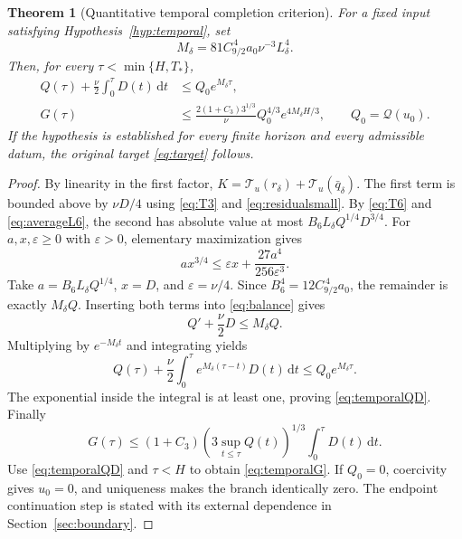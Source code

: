 \documentclass[11pt,a4paper]{article}
\newtheorem{theorem}{Theorem}[section]
\theoremstyle{definition}\newtheorem{definition}[theorem]{Definition}
\theoremstyle{remark}\newtheorem{remark}[theorem]{Remark}
\newcommand{\Q}{\mathcal Q}
\newcommand{\dd}{\,\mathrm d}
\numberwithin{equation}{section}
\begin{document}
\begin{theorem}[Quantitative temporal completion criterion]\label{thm:temporal}
For a fixed input satisfying Hypothesis~\ref{hyp:temporal}, set
\begin{equation}\label{eq:Mdelta}
 M_\delta=81C_{9/2}^{\,4}a_0\nu^{-3}L_\delta^4.
\end{equation}
Then, for every $\tau<\min\{H,T_*\}$,
\begin{align}
 Q(\tau)+\frac\nu2\int_0^\tau D(t)\dd t
 &\le Q_0e^{M_\delta\tau},\label{eq:temporalQD}\\
 G(\tau)&\le\frac{2(1+C_3)3^{1/3}}\nu
               Q_0^{4/3}e^{4M_\delta H/3},
 \qquad Q_0=\Q(u_0).\label{eq:temporalG}
\end{align}
If the hypothesis is established for every finite horizon and every admissible datum, the original target \eqref{eq:target} follows.
\end{theorem}
\begin{proof}
By linearity in the first factor,
$K=\mathcal T_u(r_\delta)+\mathcal T_u(\bar q_\delta)$.
The first term is bounded above by $\nu D/4$ using \eqref{eq:T3} and \eqref{eq:residualsmall}. By \eqref{eq:T6} and \eqref{eq:averageL6}, the second has absolute value at most
$B_6 L_\delta Q^{1/4}D^{3/4}$.
For $a,x,\varepsilon\ge0$ with $\varepsilon>0$, elementary maximization gives
\begin{equation}\label{eq:Young34}
 ax^{3/4}\le\varepsilon x+\frac{27a^4}{256\varepsilon^3}.
\end{equation}
Take $a=B_6L_\delta Q^{1/4}$, $x=D$, and $\varepsilon=\nu/4$. Since
$B_6^4=12C_{9/2}^{\,4}a_0$, the remainder is exactly $M_\delta Q$. Inserting both terms into \eqref{eq:balance} gives
\begin{equation}\label{eq:tempdiff}
 Q'+\frac\nu2D\le M_\delta Q.
\end{equation}
Multiplying by $e^{-M_\delta t}$ and integrating yields
\[
 Q(\tau)+\frac\nu2\int_0^\tau e^{M_\delta(\tau-t)}D(t)\dd t
 \le Q_0e^{M_\delta\tau}.
\]
The exponential inside the integral is at least one, proving \eqref{eq:temporalQD}. Finally
\[
 G(\tau)\le(1+C_3)(3\sup_{t\le\tau}Q(t))^{1/3}\int_0^\tau D(t)\dd t.
\]
Use \eqref{eq:temporalQD} and $\tau<H$ to obtain \eqref{eq:temporalG}. If $Q_0=0$, coercivity gives $u_0=0$, and uniqueness makes the branch identically zero. The endpoint continuation step is stated with its external dependence in Section~\ref{sec:boundary}.
\end{proof}
\end{document}
